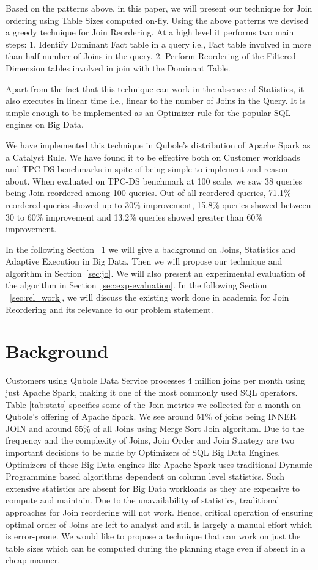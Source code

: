 \documentclass[conference]{IEEEtran}
\begin{document}
Based on the patterns above, in this paper, we will present our technique for Join ordering using Table Sizes computed on-fly. Using the above patterns we devised a greedy technique for Join Reordering. At a high level it performs two main steps:
1. Identify Dominant Fact table in a query i.e., Fact table involved in more than half number of Joins in the query.
2. Perform Reordering of the Filtered Dimension tables involved in join with the Dominant Table.

Apart from the fact that this technique can work in the absence of Statistics, it also executes in linear time i.e., linear to the number of Joins in the Query. It is simple enough to be implemented as an Optimizer rule for the popular SQL engines on Big Data.

We have implemented this technique in Qubole's distribution of Apache Spark as a Catalyst Rule. We have found it to be effective both on Customer workloads and TPC-DS benchmarks in spite of being simple to implement and reason about. When evaluated on TPC-DS benchmark at 100 scale, we saw 38 queries being Join reordered among 100 queries. Out of all reordered queries, 71.1\% reordered queries showed up to 30\% improvement, 15.8\% queries showed between 30 to 60\% improvement and 13.2\% queries showed greater than 60\% improvement.

In the following Section ~\ref{sec:background} we will give a background on Joins, Statistics and Adaptive Execution in Big Data. Then we will propose our technique and algorithm in Section~\ref{sec:jo}. We will also present an experimental evaluation of the algorithm in Section~\ref{sec:exp-evaluation}. In the following Section ~\ref{sec:rel_work}, we will discuss the existing work done in academia for Join Reordering and its relevance to our problem statement.

\section{Background}\label{sec:background}

Customers using Qubole Data Service processes 4 million joins per month using just Apache Spark, making it one of the most commonly used SQL operators. Table \ref{tab:stats} specifies some of the Join metrics we collected for a month on Qubole's offering of Apache Spark. We see around 51\% of joins being INNER JOIN and around 55\% of all Joins using Merge Sort Join algorithm. Due to the frequency and the complexity of Joins, Join Order and Join Strategy are two important decisions to be made by Optimizers of SQL Big Data Engines. Optimizers of these Big Data engines like Apache Spark uses traditional Dynamic Programming based algorithms \cite{b1} dependent on column level statistics. Such extensive statistics are absent for Big Data workloads as they are expensive to compute and maintain. Due to the unavailability of statistics, traditional approaches for Join reordering will not work. Hence, critical operation of ensuring optimal order of Joins are left to analyst and still is largely a manual effort which is error-prone. We would like to propose a technique that can work on just the table sizes which can be computed during the planning stage even if absent in a cheap manner.
\end{document}
